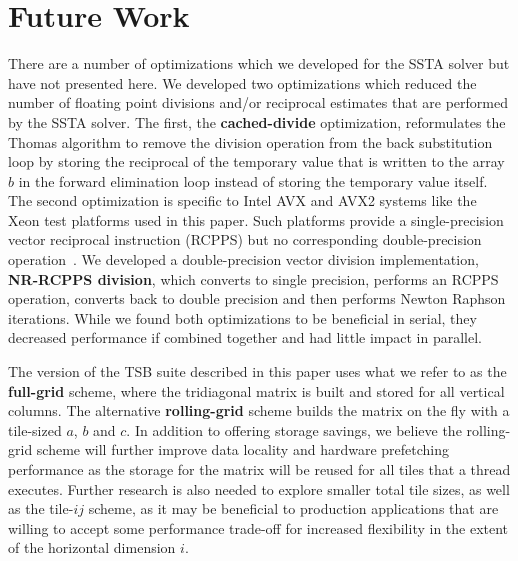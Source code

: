 \documentclass{sig-alternate}
\begin{document}
\section{Future Work}
\label{sec:future}

There are a number of optimizations which we developed for the SSTA
  solver but have not presented here. 
We developed two optimizations which reduced the number of floating point
  divisions and/or reciprocal estimates that are performed by the SSTA solver. 
The first, the \textbf{cached-divide} optimization, reformulates the Thomas 
  algorithm to remove the division operation from the back substitution loop by
  storing the reciprocal of the temporary value that is written to the array
  \(b\) in the forward elimination loop instead of storing the temporary value
  itself.
The second optimization is specific to Intel AVX and AVX2 systems like the Xeon
  test platforms used in this paper.
Such platforms provide a single-precision vector reciprocal instruction
  (RCPPS) but no corresponding double-precision
  operation~\cite{intel_opt_manual}.
We developed a double-precision vector division implementation,
  \textbf{NR-RCPPS division}, which converts to single precision, performs an
  RCPPS operation, converts back to double precision and then performs Newton
  Raphson iterations.
While we found both optimizations to be beneficial in serial, they decreased
  performance if combined together and had little impact in parallel.

The version of the TSB suite described in this paper uses what we refer to as
  the \textbf{full-grid} scheme, where the tridiagonal matrix is built and stored
  for all vertical columns.
The alternative \textbf{rolling-grid} scheme builds the matrix on the fly with
  a tile-sized \(a\), \(b\) and \(c\).
In addition to offering storage savings, we believe the rolling-grid scheme
  will further improve data locality and hardware prefetching performance as the
  storage for the matrix will be reused for all tiles that a thread
  executes.
Further research is also needed to explore smaller total tile sizes, as well as
  the tile-\(ij\) scheme, as it may be beneficial to production applications that
  are willing to accept some performance trade-off for increased flexibility in
  the extent of the horizontal dimension \(i\).

\end{document}
